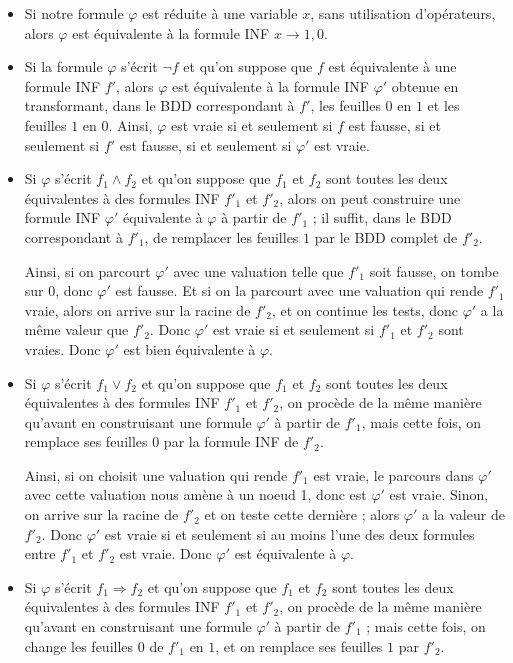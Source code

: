 \documentclass[a4paper,11pt]{article}
\begin{document}
		\begin{itemize}
		\item Si notre formule $\varphi$ est réduite à une variable $x$, sans utilisation d'opérateurs, alors $\varphi$ est équivalente à la formule INF $x \rightarrow 1,0$.
		\item Si la formule $\varphi$ s'écrit $\neg f$ et qu'on suppose que $f$ est équivalente à une formule INF $f'$, alors $\varphi$ est équivalente à la formule INF $\varphi'$ obtenue en transformant, dans le BDD correspondant à $f'$, les feuilles $0$ en $1$ et les feuilles $1$ en $0$. Ainsi, $\varphi$ est vraie si et seulement si $f$ est fausse, si et seulement si $f'$ est fausse, si et seulement si $\varphi'$ est vraie. 
		\item Si $\varphi$ s'écrit $f_1 \wedge f_2$ et qu'on suppose que $f_1$ et $f_2$ sont toutes les deux équivalentes à des formules INF ${f'}_1$ et ${f'}_2$, alors on peut construire une formule INF $\varphi'$ équivalente à $\varphi$ à partir de ${f'}_1$ ; il suffit, dans le BDD correspondant à ${f'}_1$, de remplacer les feuilles $1$ par le BDD complet de ${f'}_2$.
		
		Ainsi, si on parcourt $\varphi'$ avec une valuation telle que ${f'}_1$ soit fausse, on tombe sur $0$, donc $\varphi'$ est fausse. Et si on la parcourt avec une valuation qui rende ${f'}_1$ vraie, alors on arrive sur la racine de ${f'}_2$, et on continue les tests, donc $\varphi'$ a la même valeur que ${f'}_2$. Donc $\varphi'$ est vraie si et seulement si ${f'}_1$ et ${f'}_2$ sont vraies. Donc $\varphi'$ est bien équivalente à $\varphi$.
		\item Si $\varphi$ s'écrit $f_1 \vee f_2$ et qu'on suppose que $f_1$ et $f_2$ sont toutes les deux équivalentes à des formules INF ${f'}_1$ et ${f'}_2$, on procède de la même manière qu'avant en construisant une formule $\varphi'$ à partir de ${f'}_1$, mais cette fois, on remplace ses feuilles $0$ par la formule INF de ${f'}_2$.
		
		Ainsi, si on choisit une valuation qui rende ${f'}_1$ est vraie, le parcours dans $\varphi'$ avec cette valuation nous amène à un noeud 1, donc est $\varphi'$ est vraie. Sinon, on arrive sur la racine de ${f'}_2$ et on teste cette dernière ; alors $\varphi'$ a la valeur de ${f'}_2$. Donc $\varphi'$ est vraie si et seulement si au moins l'une des deux formules entre ${f'}_1$ et ${f'}_2$ est vraie.
		Donc $\varphi'$ est équivalente à $\varphi$.
		\item Si $\varphi$ s'écrit $f_1 \Rightarrow f_2$ et qu'on suppose que $f_1$ et $f_2$ sont toutes les deux équivalentes à des formules INF ${f'}_1$ et ${f'}_2$, on procède de la même manière qu'avant en construisant une formule $\varphi'$ à partir de ${f'}_1$ ; mais cette fois, on change les feuilles $0$ de ${f'}_1$ en $1$, et on remplace ses feuilles $1$ par ${f'}_2$.
		

\end{itemize}
\end{document}
